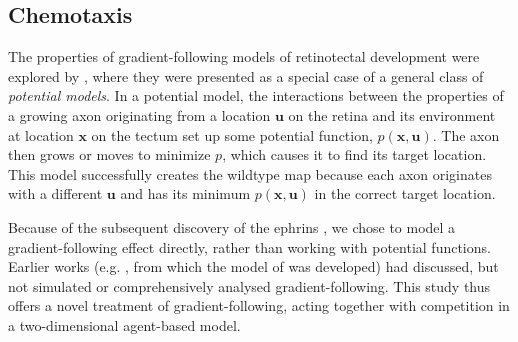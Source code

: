\documentclass[9pt]{elife} %
\begin{document}
\subsection*{Chemotaxis}

The properties of gradient-following models of retinotectal development were explored by \citet{gierer_development_1981,gierer_model_1983,gierer_directional_1987}, where they were presented as a special case of a general class of \emph{potential models}.
In a potential model, the interactions between the properties of a growing axon originating from a location $\mathbf{u}$ on the retina and its environment at location $\mathbf{x}$ on the tectum set up some potential function, $p(\mathbf{x},\mathbf{u})$.
The axon then grows or moves to minimize $p$, which causes it to find its target location. This model successfully creates the wildtype map because each axon originates with a different $\mathbf{u}$ and has its minimum $p(\mathbf{x},\mathbf{u})$ in the correct target location.

Because of the subsequent discovery of the ephrins \citep{cheng_complementary_1995,drescher_vitro_1995}, we chose to model a gradient-following effect directly, rather than working with potential functions.
Earlier works (e.g. \citet{hope_arrow_1976}, from which the model of \citet{simpson_simple_2011} was developed) had discussed, but not simulated or comprehensively analysed gradient-following.
This study thus offers a novel treatment of gradient-following, acting together with competition in a two-dimensional agent-based model.
\end{document}

